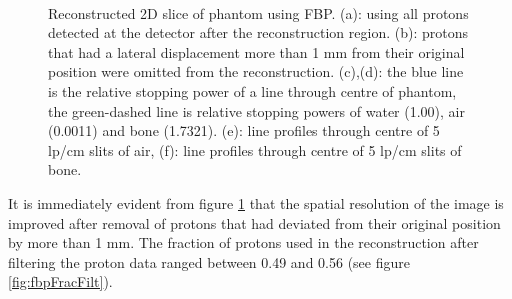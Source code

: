 \documentclass[11pt,a4paper]{article}
\begin{document}
\begin{figure}[!htpb]
   \hspace{2em}%
  \\ 
\caption{Reconstructed 2D slice of phantom using FBP. (a): using all protons detected at the detector after the reconstruction region. (b): protons that had a lateral displacement more than 1 mm from their original position were omitted from the reconstruction. (c),(d): the blue line is the relative stopping power of a line through centre of phantom, the green-dashed line is relative stopping powers of water (1.00), air (0.0011) and bone (1.7321). (e): line profiles through centre of 5 lp/cm slits of air, (f): line profiles through centre of 5 lp/cm slits of bone.}
\label{fig:fbpPhantomSlitImage}
\end{figure}

It is immediately evident from figure \ref{fig:fbpPhantomSlitImage} that the spatial resolution of the image is improved after removal of protons that had deviated from their original position by more than 1 mm. The fraction of protons used in the reconstruction after filtering the proton data ranged between 0.49 and 0.56 (see figure \ref{fig:fbpFracFilt}).
\end{document}
